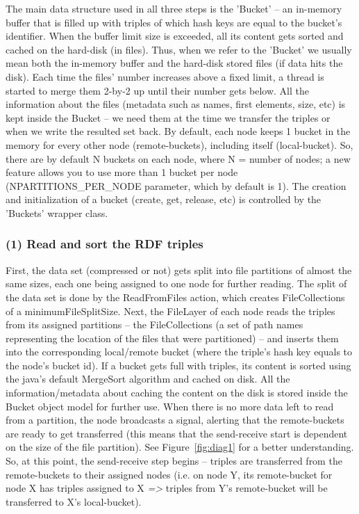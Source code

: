 The main data structure used in all three steps is the 'Bucket' -- an in-memory buffer that is filled up with triples of which hash keys are equal to the bucket's identifier. When the buffer limit size is exceeded, all its content gets sorted and cached on the hard-disk (in files). Thus, when we refer to the 'Bucket' we usually mean both the in-memory buffer and the hard-disk stored files (if data hits the disk). Each time the files' number increases above a fixed limit, a thread is started to merge them 2-by-2 up until their number gets below. All the information about the files (metadata such as names, first elements, size, etc) is kept inside the Bucket -- we need them at the time we transfer the triples or when we write the resulted set back. By default, each node keeps 1 bucket in the memory for every other node (remote-buckets), including itself (local-bucket). So, there are by default N buckets on each node, where N = number of nodes; a new feature allows you to use more than 1 bucket per node (NPARTITIONS\_PER\_NODE parameter, which by default is 1). The creation and initialization of a bucket (create, get, release, etc) is controlled by the 'Buckets' wrapper class.

% 
\subsubsection*{(1) Read and sort the RDF triples}

First, the data set (compressed or not) gets split into file partitions of almost the same sizes, each one being assigned to one node for further reading. The split of the data set is done by the ReadFromFiles action, which creates FileCollections of a minimumFileSplitSize. Next, the FileLayer of each node reads the triples from its assigned partitions -- the FileCollections (a set of path names representing the location of the files that were partitioned) -- and inserts them into the corresponding local/remote bucket (where the triple's hash key equals to the node's bucket id). If a bucket gets full with triples, its content is sorted using the java's default MergeSort algorithm and cached on disk. All the information/metadata about caching the content on the disk is stored inside the Bucket object model for further use. When there is no more data left to read from a partition, the node broadcasts a signal, alerting that the remote-buckets are ready to get transferred (this means that the send-receive start is dependent on the size of the file partition). See Figure~\ref{fig:diag1} for a better understanding. So, at this point, the send-receive step begins -- triples are transferred from the remote-buckets to their assigned nodes (i.e. on node Y, its remote-bucket for node X has triples assigned to X \textit{=>} triples from Y's remote-bucket will be transferred to X's local-bucket).

